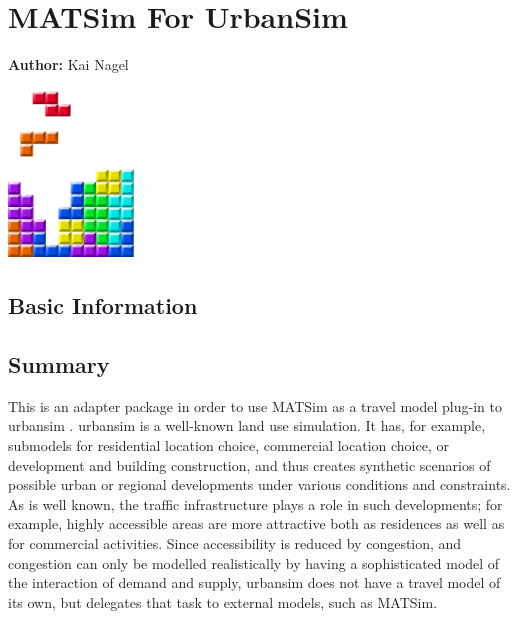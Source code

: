 \chapter{MATSim For UrbanSim}
\label{ch:matsim4urbansim}

\hfill \textbf{Author:} Kai Nagel

\begin{center} \includegraphics[width=0.25\textwidth, angle=0]{figures/MATSimBook.png} \end{center}

\section{Basic Information}
\label{sec:matsim4urbansim-stdInfo}


\section{Summary}


This is an adapter package in order to use MATSim as a travel model plug-in to \acrshort{urbansim} \citep[e.g.][see \url{http://www.urbansim.org}]{WaddellEtc2003UrbanSim}.
%
\acrshort{urbansim} is a well-known land use simulation.  It has, for example, submodels for residential location choice, commercial location choice, or development and building construction, and thus creates synthetic scenarios of possible urban or regional developments under various conditions and constraints.  As is well known, the traffic infrastructure plays a role in such developments; for example, highly accessible areas are more attractive both as residences as well as for commercial activities.  Since accessibility is reduced by congestion, and congestion can only be modelled realistically by having a sophisticated model of the interaction of demand and supply, \acrshort{urbansim} does not have a travel model of its own, but delegates that task to external models, such as MATSim.

